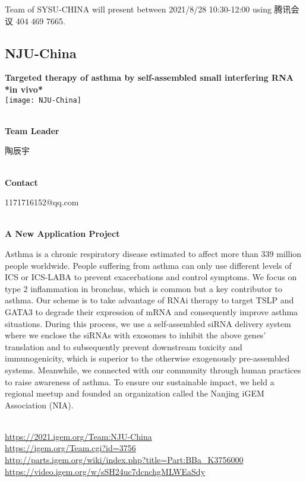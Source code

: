 Team of SYSU-CHINA will present between     2021/8/28 10:30-12:00    using 腾讯会议 404 469 7665.
\newpage


\subsection{\textcolor{Blu}{ NJU-China } }
\vspace{5mm}
\begin{center}
\large{
  \textbf{ Targeted therapy of asthma by self-assembled small interfering RNA *in vivo* }\\
  \texttt{[image: NJU-China]}
}
\end{center}
\textbf{\\Team Leader}

  陶辰宇


\textbf{\\Contact}

  1171716152@qq.com


\textbf{\\A New Application Project\\}\begin{spacing}{1.5}

Asthma is a chronic respiratory disease estimated to affect more than 339 million people worldwide. People suffering from asthma can only use different levels of ICS or ICS-LABA to prevent exacerbations and control symptoms. We focus on type 2 inflammation in bronchus, which is common but a key contributor to asthma. Our scheme is to take advantage of RNAi therapy to target TSLP and GATA3 to degrade their expression of mRNA and consequently improve asthma situations. During this process, we use a self-assembled siRNA delivery system where we enclose the siRNAs with exosomes to inhibit the above genes’ translation and to subsequently prevent downstream toxicity and immunogenicity, which is superior to the otherwise exogenously pre-assembled systems. Meanwhile, we connected with our community through human practices to raise awareness of asthma. To ensure our sustainable impact, we held a regional meetup and founded an organization called the Nanjing iGEM Association (NIA).\end{spacing}
\\

\url{https://2021.igem.org/Team:NJU-China }\\
\url{https://igem.org/Team.cgi?id=3756 }\\
\url{http://parts.igem.org/wiki/index.php?title=Part:BBa_K3756000 }\\
\url{https://video.igem.org/w/sSH24uc7dcnchgMLWEaSdy }\\

